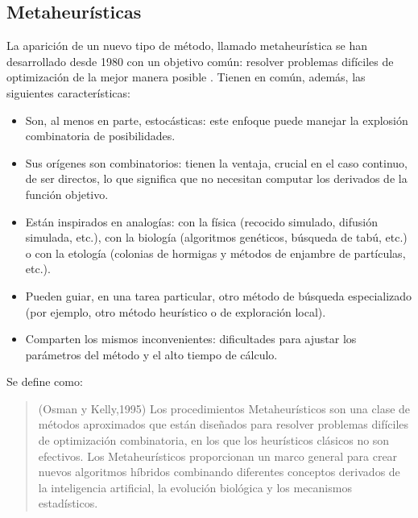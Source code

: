 \subsection{Metaheurísticas}
La aparición de un nuevo tipo de método, llamado metaheurística se han desarrollado desde 1980 con un objetivo común: resolver problemas difíciles de optimización de la mejor manera posible \cite{Collette2003MultiobjectiveStudies}. Tienen en común, además, las siguientes características:
\begin{itemize}[noitemsep]
    \item Son, al menos en parte, estocásticas: este enfoque puede manejar la explosión combinatoria de posibilidades. 
    \item Sus orígenes son combinatorios: tienen la ventaja, crucial en el caso continuo, de ser directos, lo que significa que no necesitan computar los derivados de la función objetivo.
    \item Están inspirados en analogías: con la física (recocido simulado, difusión simulada, etc.), con la biología (algoritmos genéticos, búsqueda de tabú, etc.) o con la etología (colonias de hormigas y métodos de enjambre de partículas, etc.). 
    \item Pueden guiar, en una tarea particular, otro método de búsqueda especializado (por ejemplo, otro método heurístico o de exploración local). 
    \item Comparten los mismos inconvenientes: dificultades para ajustar los parámetros del método y el alto tiempo de cálculo. 
\end{itemize}
Se define como:
\begin{quote}(Osman y Kelly,1995) Los procedimientos Metaheurísticos son una clase de métodos aproximados que están diseñados para resolver problemas difíciles de optimización combinatoria, en los que los heurísticos clásicos no son efectivos. Los Metaheurísticos proporcionan un marco general para crear nuevos algoritmos híbridos combinando diferentes conceptos derivados de la inteligencia artificial, la evolución biológica y los mecanismos estadísticos. \cite{MartiProcedimientosCombinatoria}\end{quote}

